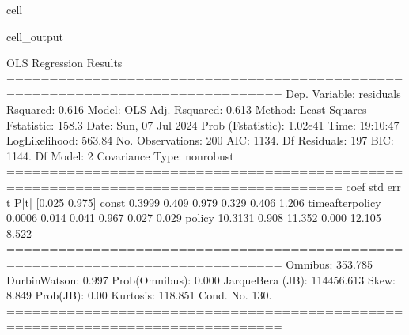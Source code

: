\documentclass[letterpaper,10pt,english]{jupyterBook}
\begin{document}
\begin{sphinxuseclass}{cell}
\begin{sphinxVerbatimOutput}
\begin{sphinxuseclass}{cell_output}
\begin{sphinxVerbatim}[commandchars=\\\{\}]
                            OLS Regression Results                            
==============================================================================
Dep. Variable:              residuals   R\PYGZhy{}squared:                       0.616
Model:                            OLS   Adj. R\PYGZhy{}squared:                  0.613
Method:                 Least Squares   F\PYGZhy{}statistic:                     158.3
Date:                Sun, 07 Jul 2024   Prob (F\PYGZhy{}statistic):           1.02e\PYGZhy{}41
Time:                        19:10:47   Log\PYGZhy{}Likelihood:                \PYGZhy{}563.84
No. Observations:                 200   AIC:                             1134.
Df Residuals:                     197   BIC:                             1144.
Df Model:                           2                                         
Covariance Type:            nonrobust                                         
=====================================================================================
                        coef    std err          t      P\PYGZgt{}|t|      [0.025      0.975]
\PYGZhy{}\PYGZhy{}\PYGZhy{}\PYGZhy{}\PYGZhy{}\PYGZhy{}\PYGZhy{}\PYGZhy{}\PYGZhy{}\PYGZhy{}\PYGZhy{}\PYGZhy{}\PYGZhy{}\PYGZhy{}\PYGZhy{}\PYGZhy{}\PYGZhy{}\PYGZhy{}\PYGZhy{}\PYGZhy{}\PYGZhy{}\PYGZhy{}\PYGZhy{}\PYGZhy{}\PYGZhy{}\PYGZhy{}\PYGZhy{}\PYGZhy{}\PYGZhy{}\PYGZhy{}\PYGZhy{}\PYGZhy{}\PYGZhy{}\PYGZhy{}\PYGZhy{}\PYGZhy{}\PYGZhy{}\PYGZhy{}\PYGZhy{}\PYGZhy{}\PYGZhy{}\PYGZhy{}\PYGZhy{}\PYGZhy{}\PYGZhy{}\PYGZhy{}\PYGZhy{}\PYGZhy{}\PYGZhy{}\PYGZhy{}\PYGZhy{}\PYGZhy{}\PYGZhy{}\PYGZhy{}\PYGZhy{}\PYGZhy{}\PYGZhy{}\PYGZhy{}\PYGZhy{}\PYGZhy{}\PYGZhy{}\PYGZhy{}\PYGZhy{}\PYGZhy{}\PYGZhy{}\PYGZhy{}\PYGZhy{}\PYGZhy{}\PYGZhy{}\PYGZhy{}\PYGZhy{}\PYGZhy{}\PYGZhy{}\PYGZhy{}\PYGZhy{}\PYGZhy{}\PYGZhy{}\PYGZhy{}\PYGZhy{}\PYGZhy{}\PYGZhy{}\PYGZhy{}\PYGZhy{}\PYGZhy{}\PYGZhy{}
const                 0.3999      0.409      0.979      0.329      \PYGZhy{}0.406       1.206
time\PYGZus{}after\PYGZus{}policy     0.0006      0.014      0.041      0.967      \PYGZhy{}0.027       0.029
policy              \PYGZhy{}10.3131      0.908    \PYGZhy{}11.352      0.000     \PYGZhy{}12.105      \PYGZhy{}8.522
==============================================================================
Omnibus:                      353.785   Durbin\PYGZhy{}Watson:                   0.997
Prob(Omnibus):                  0.000   Jarque\PYGZhy{}Bera (JB):           114456.613
Skew:                           8.849   Prob(JB):                         0.00
Kurtosis:                     118.851   Cond. No.                         130.
==============================================================================


\end{sphinxVerbatim}
\end{sphinxuseclass}
\end{sphinxVerbatimOutput}
\end{sphinxuseclass}
\end{document}
